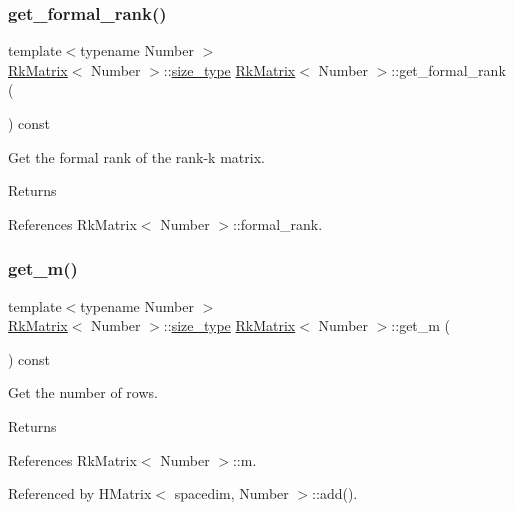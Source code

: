 \subsubsection{\texorpdfstring{get\+\_\+formal\+\_\+rank()}{get\_formal\_rank()}}
{\footnotesize\ttfamily template$<$typename Number $>$ \\
\hyperlink{classRkMatrix}{Rk\+Matrix}$<$ Number $>$\+::\hyperlink{classRkMatrix_add060bfc3a4cc77f858c3d6dd58cadd5}{size\+\_\+type} \hyperlink{classRkMatrix}{Rk\+Matrix}$<$ Number $>$\+::get\+\_\+formal\+\_\+rank (\begin{DoxyParamCaption}{ }\end{DoxyParamCaption}) const}

Get the formal rank of the rank-\/k matrix. \begin{DoxyReturn}{Returns}

\end{DoxyReturn}


References Rk\+Matrix$<$ Number $>$\+::formal\+\_\+rank.

\mbox{\label{classRkMatrix_a58686c65ca8c952558eae4fa185e7d6a}} 
\subsubsection{\texorpdfstring{get\+\_\+m()}{get\_m()}}
{\footnotesize\ttfamily template$<$typename Number $>$ \\
\hyperlink{classRkMatrix}{Rk\+Matrix}$<$ Number $>$\+::\hyperlink{classRkMatrix_add060bfc3a4cc77f858c3d6dd58cadd5}{size\+\_\+type} \hyperlink{classRkMatrix}{Rk\+Matrix}$<$ Number $>$\+::get\+\_\+m (\begin{DoxyParamCaption}{ }\end{DoxyParamCaption}) const}

Get the number of rows. \begin{DoxyReturn}{Returns}

\end{DoxyReturn}


References Rk\+Matrix$<$ Number $>$\+::m.



Referenced by H\+Matrix$<$ spacedim, Number $>$\+::add().

\mbox{\label{classRkMatrix_a4f719c760482c2ab75cc5647277a9cdd}} 
